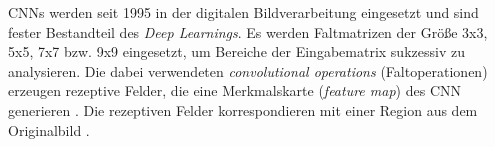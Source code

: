 \acp{CNN} werden seit 1995 in der digitalen Bildverarbeitung eingesetzt und sind fester Bestandteil des \emph{Deep Learnings}. Es werden Faltmatrizen der Größe 3x3, 5x5, 7x7 bzw. 9x9 eingesetzt, um Bereiche der Eingabematrix sukzessiv zu analysieren. Die dabei verwendeten \emph{convolutional operations} (Faltoperationen) erzeugen rezeptive Felder, die eine Merkmalskarte (\emph{feature map}) des \ac{CNN} generieren \cite{russakovsky2015imagenet}. Die rezeptiven Felder korrespondieren mit einer Region aus dem Originalbild \cite{Yan2020}. 
\usetikzlibrary{matrix,positioning}
\begin{figure}[htb]
\centering
{}
\end{figure}
